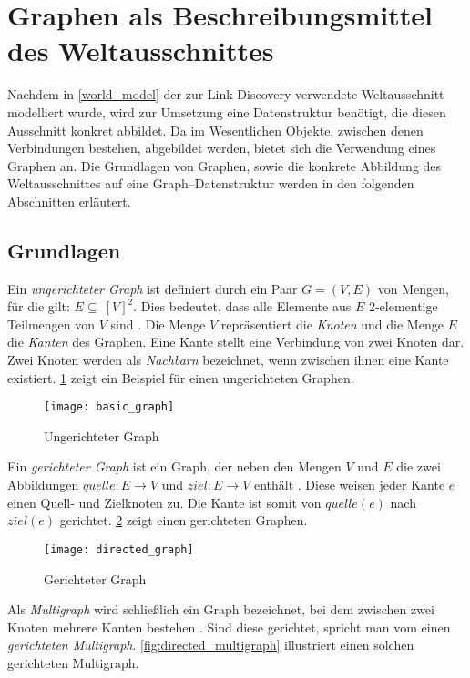 \section{Graphen als Beschreibungsmittel des Weltausschnittes}

Nachdem in \cref{world_model} der zur Link Discovery verwendete Weltausschnitt modelliert wurde, wird zur Umsetzung eine Datenstruktur benötigt, die diesen Ausschnitt konkret abbildet. Da im Wesentlichen Objekte, zwischen denen Verbindungen bestehen, abgebildet werden, bietet sich die Verwendung eines Graphen an. Die Grundlagen von Graphen, sowie die konkrete Abbildung des Weltausschnittes auf eine Graph--Datenstruktur werden in den folgenden Abschnitten erläutert.

\subsection{Grundlagen}
\label{graph_basics}

Ein \emph{ungerichteter Graph} ist definiert durch ein Paar \(G = (V,E)\) von Mengen, für die gilt: \(E \subseteq\ [V]^2\). Dies bedeutet, dass alle Elemente aus \(E\) 2-elementige Teilmengen von \(V\) sind \cite[S. 2]{rd2012}. Die Menge \(V\) repräsentiert die \emph{Knoten} und die Menge \(E\) die \emph{Kanten} des Graphen. Eine Kante stellt eine Verbindung von zwei Knoten dar. Zwei Knoten werden als \emph{Nachbarn} bezeichnet, wenn zwischen ihnen eine Kante existiert. \cref{fig:basic_graph} zeigt ein Beispiel für einen ungerichteten Graphen.

\begin{figure}[h]
\centering
\texttt{[image: basic\_graph]}
\caption{Ungerichteter Graph}
\label{fig:basic_graph}
\end{figure}

Ein \emph{gerichteter Graph} ist ein Graph, der neben den Mengen \(V\) und \(E\) die zwei Abbildungen \(quelle: E \rightarrow V\) und \(ziel: E \rightarrow V\) enthält \cite[S. 25]{rd2012}. Diese weisen jeder Kante \(e\) einen Quell- und Zielknoten zu. Die Kante ist somit von \(quelle(e)\) nach \(ziel(e)\) gerichtet. \cref{fig:directed_graph} zeigt einen gerichteten Graphen.

\begin{figure}[ht]
\centering
\texttt{[image: directed\_graph]}
\caption{Gerichteter Graph}
\label{fig:directed_graph}
\end{figure}

Als \emph{Multigraph} wird schließlich ein Graph bezeichnet, bei dem zwischen zwei Knoten mehrere Kanten bestehen \cite[S. 25]{rd2012}. Sind diese gerichtet, spricht man vom einen \emph{gerichteten Multigraph}. \cref{fig:directed_multigraph} illustriert einen solchen gerichteten Multigraph.

